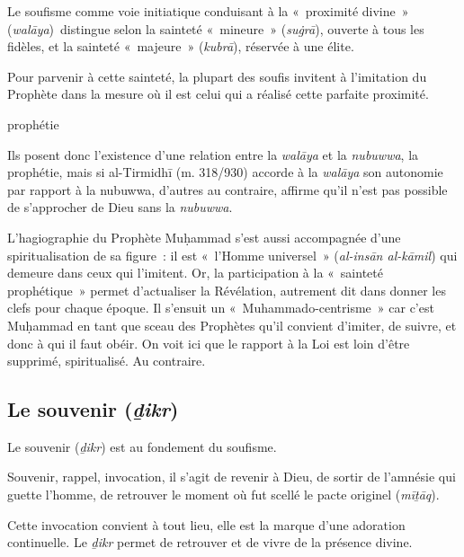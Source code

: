 
\begin{Def}
Le soufisme comme voie initiatique conduisant à la «~proximité divine~»
(\emph{walāya})~distingue selon la sainteté «~mineure~» (\emph{suġrā}),
ouverte à tous les fidèles, et la sainteté «~majeure~» (\emph{kubrā}),
réservée à une élite. 
\end{Def}
Pour parvenir à cette sainteté, la plupart des
soufis invitent à l'imitation du Prophète dans la mesure où il est celui
qui a réalisé cette parfaite proximité. 
\begin{Def}
prophétie
\end{Def}

Ils posent donc l'existence
d'une relation entre la \emph{walāya} et la \emph{nubuwwa}, la
prophétie, mais si al-Tirmidhī (m. 318/930) accorde à la \emph{walāya}
son autonomie par rapport à la nubuwwa, d'autres au contraire, affirme
qu'il n'est pas possible de s'approcher de Dieu sans la \emph{nubuwwa}. 

L'hagiographie du Prophète Muḥammad s'est aussi accompagnée d'une
spiritualisation de sa figure~: il est «~l'Homme universel~»
(\emph{al-insān al-kāmil}) qui demeure dans ceux qui l'imitent. Or, la
participation à la «~sainteté prophétique~» permet d'actualiser la
Révélation, autrement dit dans donner les clefs pour chaque époque. Il
s'ensuit un «~Muhammado-centrisme~» car c'est Muḥammad en tant que sceau
des Prophètes qu'il convient d'imiter, de suivre, et donc à qui il faut
obéir. On voit ici que le rapport à la Loi est loin d'être supprimé,
spiritualisé. Au contraire.

 
\subsection{Le souvenir
(\emph{ḏikr})} \label{le-souvenir-dikr}

Le souvenir (\emph{ḏikr}) est au fondement du soufisme.
\begin{Def}[{ḏikr}]
Souvenir,
rappel, invocation, il s'agit de revenir à Dieu, de sortir de l'amnésie
qui guette l'homme, de retrouver le moment où fut scellé le pacte
originel (\emph{mīṯāq}).
\end{Def}
  Cette invocation convient à tout lieu, elle est
la marque d'une adoration continuelle. Le \emph{ḏikr} permet de
retrouver et de vivre de la présence divine.

